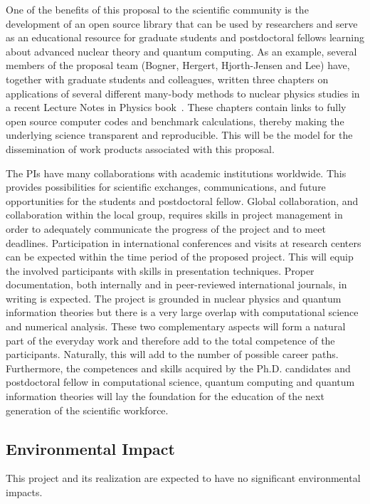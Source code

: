 \documentclass[11pt]{article}
\begin{document}
One of the benefits of this proposal to the scientific community 
is the development of an
open source library that can be used by researchers and serve as an
educational resource for graduate students and postdoctoral fellows learning about advanced nuclear theory and quantum computing.  As an example, several members of the proposal team (Bogner, Hergert, Hjorth-Jensen and Lee) have, together with graduate
students and colleagues, written three chapters on
applications of several different many-body methods to nuclear physics studies in a recent Lecture
Notes in Physics book~\cite{lnp}. These chapters contain links to fully open source computer codes and benchmark calculations, thereby making the underlying science
transparent and reproducible.  This will be the model for the dissemination of work products associated with this proposal.

The PIs have many collaborations with academic institutions worldwide. This 
provides possibilities for scientific exchanges, communications, and future opportunities for the students and postdoctoral fellow. Global collaboration, and collaboration
within the local group, requires skills in project management in order
to adequately communicate the progress of the project and to meet
deadlines. Participation in international conferences and visits at
research centers can be expected within the time period of the proposed
project. This will equip the involved participants with skills in
presentation techniques.  Proper documentation, both internally and in
peer-reviewed international journals, in writing is expected. The
project is grounded in nuclear physics and quantum information theories but there is a very large
overlap with computational science and numerical analysis. These two
complementary aspects will form a natural part of the everyday work
and therefore add to the total competence of the
participants. Naturally, this will add to the number of possible
career paths.  Furthermore, the competences and skills acquired by the Ph.D. candidates and postdoctoral fellow in computational science, quantum computing and quantum information theories will lay the foundation for the education of the next generation of the scientific workforce. 

\subsection{Environmental Impact}

This project and its realization are expected to have no significant environmental impacts.
\end{document}
